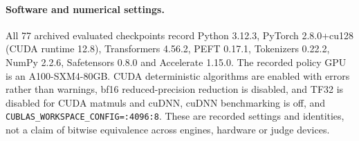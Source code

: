 \documentclass{article}
\begin{document}
\paragraph{Software and numerical settings.} All 77 archived evaluated
checkpoints record Python 3.12.3, PyTorch 2.8.0+cu128 (CUDA runtime 12.8),
Transformers 4.56.2, PEFT 0.17.1, Tokenizers 0.22.2, NumPy 2.2.6,
Safetensors 0.8.0 and Accelerate 1.15.0. The recorded policy GPU is an
A100-SXM4-80GB. CUDA deterministic algorithms are enabled with errors rather
than warnings, bf16 reduced-precision reduction is disabled, and TF32 is disabled for CUDA matmuls and cuDNN, cuDNN benchmarking
is off, and \texttt{CUBLAS\_WORKSPACE\_CONFIG=:4096:8}. These are recorded
settings and identities, not a claim of bitwise equivalence across engines,
hardware or judge devices.
\end{document}
